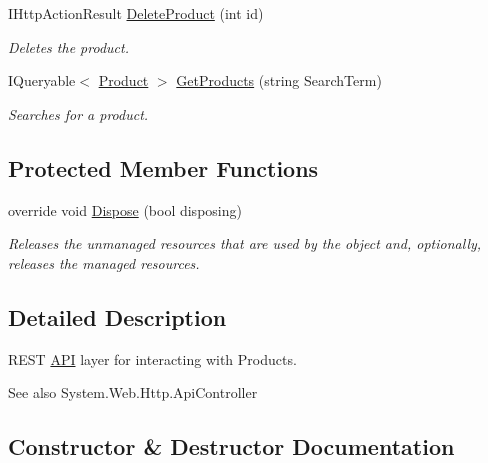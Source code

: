 \begin{DoxyCompactItemize}
I\+Http\+Action\+Result \hyperlink{class_open_1_1_g_i_1_1hypermart_1_1_controllers_1_1_a_p_i_1_1_products_controller_a0c7c45df129f67ada9c5cac65ddd01a3}{Delete\+Product} (int id)
\begin{DoxyCompactList}\small\item\em Deletes the product. \end{DoxyCompactList}\item 
I\+Queryable$<$ \hyperlink{class_open_1_1_g_i_1_1hypermart_1_1_models_1_1_product}{Product} $>$ \hyperlink{class_open_1_1_g_i_1_1hypermart_1_1_controllers_1_1_a_p_i_1_1_products_controller_a5fe504dff28b3f3bdb69623ddd095d93}{Get\+Products} (string Search\+Term)
\begin{DoxyCompactList}\small\item\em Searches for a product. \end{DoxyCompactList}\end{DoxyCompactItemize}
\subsection*{Protected Member Functions}
\begin{DoxyCompactItemize}
\item 
override void \hyperlink{class_open_1_1_g_i_1_1hypermart_1_1_controllers_1_1_a_p_i_1_1_products_controller_a4e48b5e7914c88c15e1187ef6bfb1e09}{Dispose} (bool disposing)
\begin{DoxyCompactList}\small\item\em Releases the unmanaged resources that are used by the object and, optionally, releases the managed resources. \end{DoxyCompactList}\end{DoxyCompactItemize}


\subsection{Detailed Description}
R\+E\+ST \hyperlink{namespace_open_1_1_g_i_1_1hypermart_1_1_controllers_1_1_a_p_i}{A\+PI} layer for interacting with Products. 

\begin{DoxySeeAlso}{See also}
System.\+Web.\+Http.\+Api\+Controller


\end{DoxySeeAlso}


\subsection{Constructor \& Destructor Documentation}
\hypertarget{class_open_1_1_g_i_1_1hypermart_1_1_controllers_1_1_a_p_i_1_1_products_controller_ad7451660ccc9180ae0d2bca8e347d426}{}\label{class_open_1_1_g_i_1_1hypermart_1_1_controllers_1_1_a_p_i_1_1_products_controller_ad7451660ccc9180ae0d2bca8e347d426} 

